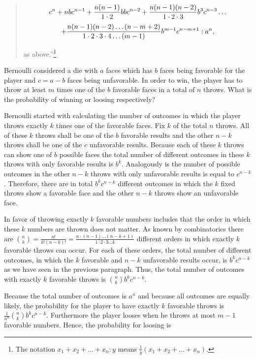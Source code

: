 \begin{quotation}
  \begin{multline*}
  c^n+nbc^{n-1}+\frac{n(n-1)}{1\cdot 2}bbc^{n-2} + \frac{n(n-1)(n-2)}{1\cdot 2\cdot 3}b^3c^{n-3} \ldots \nl
  +\frac{n(n-1)(n-2)\ldots(n-m+2)}{1\cdot 2\cdot 3\cdot 4\ldots(m-1)} b^{m-1}c^{n-m+1} : a^n,
  \end{multline*}

  as above.''\footnote{The notation $x_1+x_2+\ldots+x_n:y$ means $\tfrac 1y (x_1+x_2+\ldots+x_n)$.}
\end{quotation}

Bernoulli considered a die with $a$ faces which has $b$ faces being favorable for the player and $c=a-b$ faces being unfavorable. In order to win, the player has to throw at least $m$ times one of the $b$ favorable faces in a total of $n$ throws. What is the probability of winning or loosing respectively?

Bernoulli started with calculating the number of outcomes in which the player throws exactly $k$ times one of the favorable faces. Fix $k$ of the total $n$ throws. All of these $k$ throws shall be one of the $b$ favorable results and the other $n-k$ throws shall be one of the $c$ unfavorable results. Because each of these $k$ throws can show one of $b$ possible faces the total number of different outcomes in these $k$ throws with only favorable results is $b^k$. Analogously is the number of possible outcomes in the other $n-k$ throws with only unfavorable results is equal to $c^{n-k}$. Therefore, there are in total $b^kc^{n-k}$ different outcomes in which the $k$ fixed throws show a favorable face and the other $n-k$ throws show an unfavorable face.

In favor of throwing exactly $k$ favorable numbers includes that the order in which these $k$ numbers are thrown does not matter. As known by combinatorics there are $\binom nk=\frac{n!}{k!(n-k)!}=\frac{n\cdot(n-1)\ldots(n-k+1)}{1\cdot2\cdot3\ldots k}$ different orders in which exactly $k$ favorable throws can occur. For each of these orders, the total number of different outcomes, in which the $k$ favorable and $n-k$ unfavorable results occur, is $b^kc^{n-k}$ as we have seen in the previous paragraph. Thus, the total number of outcomes with exactly $k$ favorable throws is $\binom nk b^k c^{n-k}$.

Because the total number of outcomes is $a^n$ and because all outcomes are equally likely, the probability for the player to have exactly $k$ favorable throws is $\frac {1}{a^n} \binom nk b^k c^{n-k}$. Furthermore the player looses when he throws at most $m-1$ favorable numbers. Hence, the probability for loosing is

